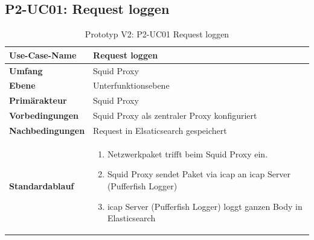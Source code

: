 \begin{table}[H]
\subsection{P2-UC01: Request loggen}
    \centering
    \begin{tabularx}{\textwidth}{| l | p{} |}
        \hline
        \textbf{Use-Case-Name}     & \textbf{Request loggen}    \\ \hline
        \textbf{Umfang}  & Squid Proxy     \\ \hline
        \textbf{Ebene} & Unterfunktionsebene   \\ \hline
        \textbf{Primärakteur} & Squid Proxy \\ \hline
        \textbf{Vorbedingungen} & Squid Proxy als zentraler Proxy konfiguriert \\ \hline
        \textbf{Nachbedingungen} & Request in Elsaticsearch gespeichert\\ \hline
        \textbf{Standardablauf} & \begin{enumerate}
        	\item Netzwerkpaket trifft beim Squid Proxy ein.
        	\item Squid Proxy sendet Paket via \gls{icap} an \gls{icap} Server (Pufferfish Logger)
        	\item \gls{icap} Server (Pufferfish Logger) loggt ganzen Body in Elasticsearch
        \end{enumerate} \\ \hline
    \end{tabularx}
    \caption{Prototyp V2: P2-UC01 Request loggen}
\end{table}



